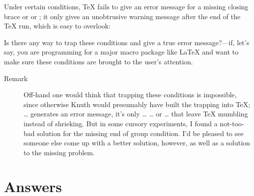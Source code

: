 Under certain conditions, TeX fails to give an error message
for a missing closing brace or \cmd{\endgroup} or ; it only gives an
unobtrusive warning message after the end of the TeX run, which is
easy to overlook:

Is there any way to trap these conditions and give a true error
message?---if, let's say, you are programming for a major macro
package like LaTeX and want to make sure these conditions are brought
to the user's attention.


\begin{description}
\item[Remark] Off-hand one would think that trapping these conditions is
impossible, since otherwise Knuth
 would presumably have built the
trapping into TeX;  \ldots \cmd{\end} generates an error message, 
it's
only  \ldots {} \ldots \cmd{\end} or  \ldots
\cmd{\end} that leave TeX
mumbling instead of shrieking. But in some cursory experiments, I
found a not-too-bad solution for the missing end of group condition.
I'd be pleased to see someone else come up with a better solution,
however, as well as a solution to the missing  problem.
\end{description}

\begin{comment}
Send answers to:

Michael Downes      mjd@math.ams.org (Internet)

A summary will be posted circa July 12, 1993.
\end{comment}


\section{Answers}

\begin{comment}
[The addendum at bottom was not posted with the answer but added in my
archives later ---mjd]

Date: 22 Jul 1993 15:54:57 -0400 (EDT)
From: Michael Downes <MJD@MATH.AMS.ORG>
Subject: Around the Bend #8 answers
To: info-tex@shsu.edu
X-ListName: TeX-Related Network Discussion List <INFO-TeX@SHSU.edu>

Exercise 8 asked for a way to trap missing }, \endgroup, or \fi at the
end of a [La]TeX document, in order to give error messages instead
of the warning messages issued by TeX:

  (\end occurred inside a group at level 1)
  (\end occurred when \iffalse on line 6 was incomplete)
\end{comment}

